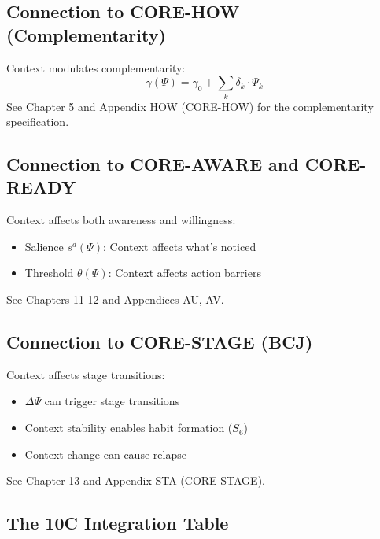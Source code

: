 \subsection{Connection to CORE-HOW (Complementarity)}

\begin{cross-reference}
Context modulates complementarity:
\begin{equation}
\gamma(\Psi) = \gamma_0 + \sum_k \delta_k \cdot \Psi_k
\end{equation}
See Chapter 5 and Appendix HOW (CORE-HOW) for the complementarity specification.
\end{cross-reference}

\subsection{Connection to CORE-AWARE and CORE-READY}

\begin{cross-reference}
Context affects both awareness and willingness:
\begin{itemize}[nosep]
  \item Salience $s^d(\Psi)$: Context affects what's noticed
  \item Threshold $\theta(\Psi)$: Context affects action barriers
\end{itemize}
See Chapters 11-12 and Appendices AU, AV.
\end{cross-reference}

\subsection{Connection to CORE-STAGE (BCJ)}

\begin{cross-reference}
Context affects stage transitions:
\begin{itemize}[nosep]
  \item $\Delta\Psi$ can trigger stage transitions
  \item Context stability enables habit formation ($S_6$)
  \item Context change can cause relapse
\end{itemize}
See Chapter 13 and Appendix STA (CORE-STAGE).
\end{cross-reference}

\subsection{The 10C Integration Table}

